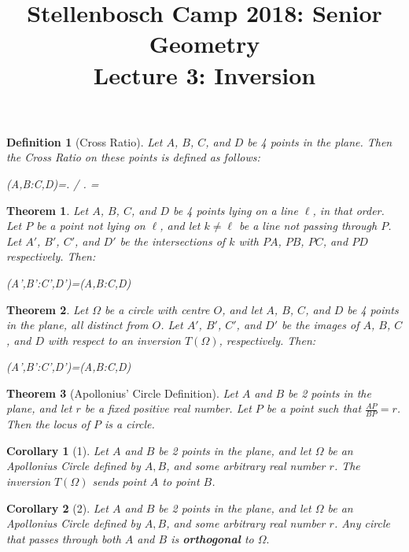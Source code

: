 \documentclass{article}
\title{Stellenbosch Camp 2018: Senior Geometry\\ \centering Lecture 3: Inversion}
\date{}
\newtheorem{theorem}{Theorem}
\newtheorem*{definition}{Definition}
\newtheorem{cor}{Corollary}
\begin{document}
	\maketitle
	\hrulefill
	\begin{definition}[Cross Ratio]
		Let $A$, $B$, $C$, and $D$ be 4 points in the plane. Then the Cross Ratio on these points is defined as follows:
		\begin{flalign}
			(A,B:C,D)=\left.  \middle/  \right. =\nonumber
		\end{flalign}
	\end{definition}
	\begin{theorem}
			Let $A$, $B$, $C$, and $D$ be 4 points lying on a line $\ell$, in that order. Let $P$ be a point not lying on $\ell$, and let $k \neq \ell$ be a line not passing through $P$. Let $A'$, $B'$, $C'$, and $D'$ be the intersections of $k$ with $PA$, $PB$, $PC$, and $PD$ respectively. Then:
			\begin{flalign}
				(A',B':C',D')=(A,B:C,D)\nonumber
			\end{flalign}
	\end{theorem}
	\begin{theorem}
		Let $\Omega$ be a circle with centre $O$, and let $A$, $B$, $C$, and $D$ be 4 points in the plane, all distinct from $O$. Let $A'$, $B'$, $C'$, and $D'$ be the images of $A$, $B$, $C$, and $D$ with respect to an inversion $T(\Omega)$, respectively. Then:
		\begin{flalign}
			(A',B':C',D')=(A,B:C,D)\nonumber
		\end{flalign}
	\end{theorem}
	\begin{theorem}[Apollonius' Circle Definition]
		Let $A$ and $B$ be 2 points in the plane, and let $r$ be a fixed positive real number. Let $P$ be a point such that $\frac{AP}{BP}=r$. Then the locus of $P$ is a circle.
	\end{theorem}
	\begin{cor}[1]
		Let $A$ and $B$ be 2 points in the plane, and let $\Omega$ be an Apollonius Circle defined by $A,B$, and some arbitrary real number $r$. The inversion $T(\Omega)$ sends point $A$ to point $B$.
	\end{cor}
	\begin{cor}[2]
		Let $A$ and $B$ be 2 points in the plane, and let $\Omega$ be an Apollonius Circle defined by $A,B$, and some arbitrary real number $r$. Any circle that passes through both $A$ and $B$ is \textbf{orthogonal} to $\Omega.$
	\end{cor}
\end{document}
